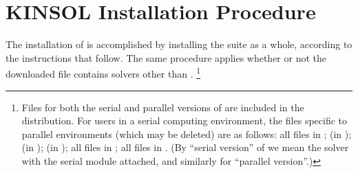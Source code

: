 \chapter{KINSOL Installation Procedure}\label{s:install}

The installation of {\kinsol} is accomplished by installing the
{\sundials} suite as a whole, according to the instructions that
follow. The same procedure applies whether or not the downloaded
file contains solvers other than {\kinsol}. \footnote{Files for both
the serial and parallel versions of {\kinsol} are included in the
distribution. For users in a serial computing environment, the files
specific to parallel environments (which may be deleted) are as follows:
all files in ;
 (in );
 (in );
 (in );
all files in ;
all files in .
(By ``serial version'' of {\kinsol} we mean the {\kinsol} solver with the
serial {\nvector} module attached, and similarly for ``parallel version''.)}

